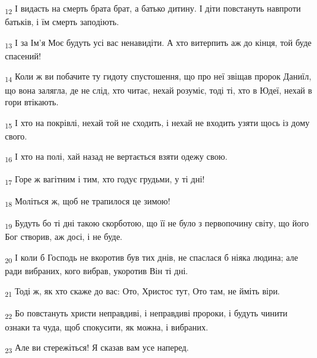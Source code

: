 \begin{tcolorbox}
\textsubscript{12} І видасть на смерть брата брат, а батько дитину. І діти повстануть навпроти батьків, і їм смерть заподіють.
\end{tcolorbox}
\begin{tcolorbox}
\textsubscript{13} І за Ім'я Моє будуть усі вас ненавидіти. А хто витерпить аж до кінця, той буде спасений!
\end{tcolorbox}
\begin{tcolorbox}
\textsubscript{14} Коли ж ви побачите ту гидоту спустошення, що про неї звіщав пророк Даниїл, що вона залягла, де не слід, хто читає, нехай розуміє, тоді ті, хто в Юдеї, нехай в гори втікають.
\end{tcolorbox}
\begin{tcolorbox}
\textsubscript{15} І хто на покрівлі, нехай той не сходить, і нехай не входить узяти щось із дому свого.
\end{tcolorbox}
\begin{tcolorbox}
\textsubscript{16} І хто на полі, хай назад не вертається взяти одежу свою.
\end{tcolorbox}
\begin{tcolorbox}
\textsubscript{17} Горе ж вагітним і тим, хто годує грудьми, у ті дні!
\end{tcolorbox}
\begin{tcolorbox}
\textsubscript{18} Моліться ж, щоб не трапилося це зимою!
\end{tcolorbox}
\begin{tcolorbox}
\textsubscript{19} Будуть бо ті дні такою скорботою, що її не було з первопочину світу, що його Бог створив, аж досі, і не буде.
\end{tcolorbox}
\begin{tcolorbox}
\textsubscript{20} І коли б Господь не вкоротив був тих днів, не спаслася б ніяка людина; але ради вибраних, кого вибрав, укоротив Він ті дні.
\end{tcolorbox}
\begin{tcolorbox}
\textsubscript{21} Тоді ж, як хто скаже до вас: Ото, Христос тут, Ото там, не йміть віри.
\end{tcolorbox}
\begin{tcolorbox}
\textsubscript{22} Бо повстануть христи неправдиві, і неправдиві пророки, і будуть чинити ознаки та чуда, щоб спокусити, як можна, і вибраних.
\end{tcolorbox}
\begin{tcolorbox}
\textsubscript{23} Але ви стережіться! Я сказав вам усе наперед.
\end{tcolorbox}
